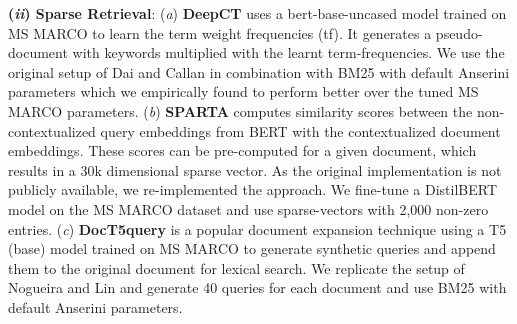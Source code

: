 \documentclass{article}
\begin{document}
\textbf{(\emph{ii}) Sparse Retrieval}: (\emph{a}) \textbf{DeepCT} \cite{10.1145/3397271.3401204} uses a bert-base-uncased model trained on MS MARCO to learn the term weight frequencies (tf). It generates a pseudo-document with keywords multiplied with the learnt term-frequencies. We use the original setup of Dai and Callan \cite{10.1145/3397271.3401204} in combination with BM25 with default Anserini parameters which we empirically found to perform better over the tuned MS MARCO parameters. (\emph{b}) \textbf{SPARTA} \cite{zhao-etal-2021-sparta} computes similarity scores between the  non-contextualized query embeddings from BERT with the contextualized document embeddings. These scores can be pre-computed for a given document, which results in a 30k dimensional sparse vector. As the original implementation is not publicly available, we re-implemented the approach. We fine-tune a DistilBERT \cite{sanh2020distilbert} model on the MS MARCO dataset and use sparse-vectors with 2,000 non-zero entries. 
(\emph{c}) \textbf{DocT5query} \cite{nogueira2019doc2query} is a popular document expansion technique using a T5 (base) \cite{JMLR:v21:20-074} model trained on MS MARCO to generate synthetic queries and append them to the original document for lexical search. We replicate the setup of Nogueira and Lin \cite{nogueira2019doc2query} and generate 40 queries for each document and use BM25 with default Anserini parameters. 
\end{document}
